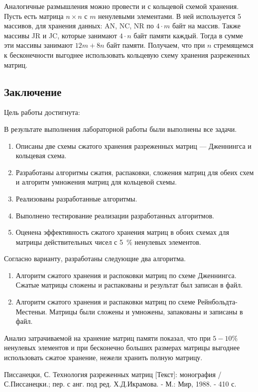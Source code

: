 \documentclass[12pt, a4paper]{article}
\begin{document}
Аналогичные размышления можно провести и с кольцевой схемой хранения. Пусть есть матрица $n \times n$ с $m$ ненулевыми элементами. В ней используется 5 массивов, для хранения данных: AN, NC, NR по $4\cdot m$ байт на массив. Также массивы JR и JC, которые занимают $4\cdot n$ байт памяти каждый. Тогда в сумме эти массивы занимают $12m + 8n$ байт памяти. Получаем, что при $n$ стремящемся к бесконечности выгоднее использовать кольцевую схему хранения разреженных матриц. 
\newpage
\begin{center}
    \section*{Заключение}
\end{center}

Цель работы достигнута:

В результате выполнения лабораторной работы были выполнены все задачи.
\begin{enumerate}
\item Описаны две схемы сжатого хранения разреженных матриц --- Дженнингса и кольцевая схема.
\item Разработаны алгоритмы сжатия, распаковки, сложения матриц для обеих схем и алгоритм умножения матриц для кольцевой схемы.
\item Реализованы разработанные алгоритмы.
\item Выполнено тестирование реализации разработанных алгоритмов.
\item Оценена эффективность сжатого хранения матриц в обоих схемах для матрицы действительных чисел с 5~\% ненулевых элементов.
\end{enumerate}

Согласно варианту, разработаны следующие два алгоритма.
\begin{enumerate}
\item Алгоритм сжатого хранения и распоковки матриц по схеме Дженнингса. Сжатые матрицы  сложены и распакованы и результат был записан в файл.
\item Алгоритм сжатого хранения и распаковки матриц по схеме Рейнбольдта-Местеньи. Матрицы были сложены и умножены, запакованы и записаны в файл.
\end{enumerate}

Анализ затрачиваемой на хранение матриц памяти показал, что при $5-10\%$ ненулевых элементов и при бесконечно больших размерах матрицы выгоднее использовать сжатое хранение, нежели хранить полную матрицу. 

\newpage
\begin{center}
\begin{thebibliography}{}
Писсанецки, С. Технология разреженных матриц [Текст]: монография / С.Писсанецки.; пер. с анг. под ред. Х.Д.Икрамова. - М.: Мир, 1988. - 410 с.
\end{thebibliography}
\end{center}
\end{document}
